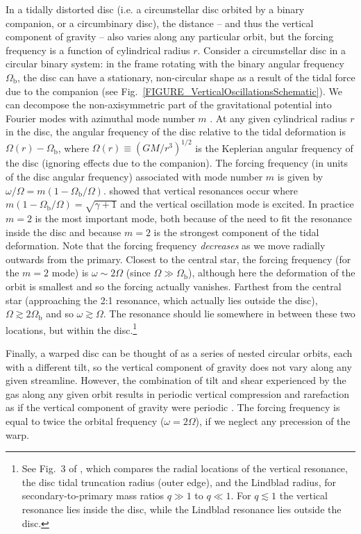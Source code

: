 \documentclass[fleqn,usenatbib]{mnras}
\begin{document}
In a tidally distorted disc (i.e. a circumstellar disc orbited by a binary companion, or a circumbinary disc), the distance -- and thus the vertical component of gravity -- also varies along any particular orbit, but the forcing frequency is a function of cylindrical radius $r$. Consider  a circumstellar disc in a circular binary system: in the frame rotating with the binary angular frequency $\Omega_\text{b}$, the disc can have a stationary, non-circular shape as a result of the tidal force due to the companion (see Fig.~\ref{FIGURE_VerticalOscillationsSchematic}). We can decompose the non-axisymmetric part of the gravitational potential into Fourier modes with azimuthal mode number $m$ \citep{lubow1981vertically, ogilvie2002tidally, ogilvie2002non}. At any given cylindrical radius $r$ in the disc, the angular frequency of the disc relative to the tidal deformation is $\Omega(r) - \Omega_\text{b}$, where $\Omega (r) \equiv (GM/r^3)^{1/2}$ is the Keplerian angular frequency of the disc (ignoring effects due to the companion). The forcing frequency (in units of the disc angular frequency) associated with mode number $m$ is given by $\omega/\Omega = m(1-\Omega_\text{b}/\Omega)$. \cite{lubow1981vertically} showed that vertical resonances occur where $m(1-\Omega_\text{b}/\Omega) = \sqrt{\gamma+1}$ and the vertical oscillation mode is excited. In practice $m = 2$ is the most important mode, both because of the need to fit the resonance inside the disc and because $m = 2$ is the strongest component of the tidal deformation. Note that the forcing frequency \textit{decreases} as we move radially outwards from the primary. Closest to the central star, the forcing frequency (for the $m=2$ mode) is $\omega \sim 2\Omega$ (since $\Omega \gg \Omega_\text{b}$), although here the deformation of the orbit is smallest and so the forcing actually vanishes. Farthest from the central star (approaching the 2:1 resonance, which actually lies outside the disc), $\Omega \gtrsim 2\Omega_\text{b}$ and so $\omega \gtrsim \Omega$. The resonance should lie somewhere in between these two locations, but within the disc.\footnote{See Fig.~3 of \citet{lubow1981vertically}, which compares the radial locations of the vertical resonance, the disc tidal truncation radius (outer edge), and the Lindblad radius, for secondary-to-primary mass ratios $q \gg 1$ to $q \ll 1$. For $q \lesssim 1$ the vertical resonance lies inside the disc, while the Lindblad resonance lies outside the disc.}

Finally, a warped disc can be thought of as a series of nested circular orbits, each with a different tilt, so the vertical component of gravity does not vary along any given streamline. However, the combination of tilt and shear experienced by the gas along any given orbit results in periodic vertical compression and rarefaction as if the vertical component of gravity were periodic \citep{ogilvie2013local, ogilvie2022hydrodynamics}. The forcing frequency is equal to twice the orbital frequency ($\omega = 2\Omega$), if we neglect any precession of the warp.
\end{document}
